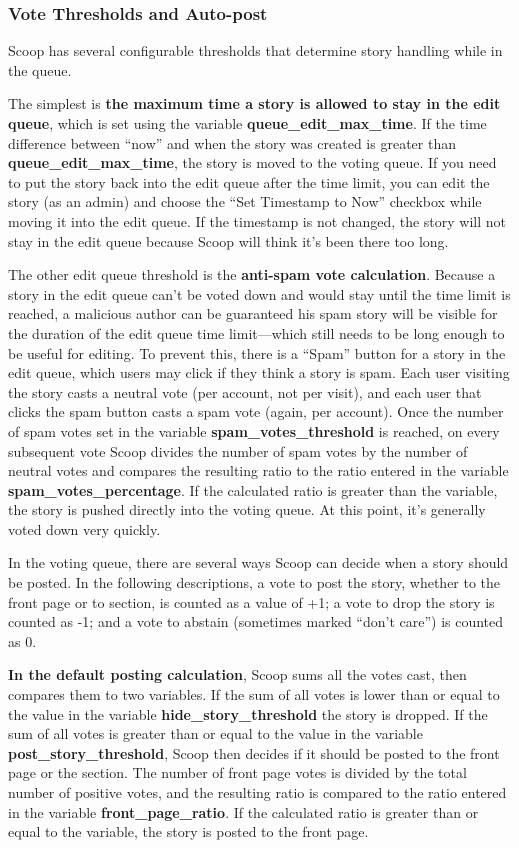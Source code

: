 \subsubsection{Vote Thresholds and Auto-post}
\label{moderation-autopost}

Scoop has several configurable thresholds that determine story handling while in the queue.

The simplest is {\bf the maximum time a story is allowed to stay in the edit queue}, which is set using the variable {\bf queue\_edit\_max\_time}.  If the time difference between ``now'' and when the story was created is greater than {\bf queue\_edit\_max\_time}, the story is moved to the voting queue.  If you need to put the story back into the edit queue after the time limit, you can edit the story (as an admin) and choose the ``Set Timestamp to Now'' checkbox while moving it into the edit queue.  If the timestamp is not changed, the story will not stay in the edit queue because Scoop will think it's been there too long.

The other edit queue threshold is the {\bf anti-spam vote calculation}.  Because a story in the edit queue can't be voted down and would stay until the time limit is reached, a malicious author can be guaranteed his spam story will be visible for the duration of the edit queue time limit---which still needs to be long enough to be useful for editing.  To prevent this, there is a ``Spam'' button for a story in the edit queue, which users may click if they think a story is spam.  Each user visiting the story casts a neutral vote (per account, not per visit), and each user that clicks the spam button casts a spam vote (again, per account).  Once the number of spam votes set in the variable {\bf spam\_votes\_threshold} is reached, on every subsequent vote Scoop divides the number of spam votes by the number of neutral votes and compares the resulting ratio to the ratio entered in the variable {\bf spam\_votes\_percentage}.  If the calculated ratio is greater than the variable, the story is pushed directly into the voting queue.  At this point, it's generally voted down very quickly.

In the voting queue, there are several ways Scoop can decide when a story should be posted.  In the following descriptions, a vote to post the story, whether to the front page or to section, is counted as a value of +1; a vote to drop the story is counted as -1; and a vote to abstain (sometimes marked ``don't care'') is counted as 0.

{\bf In the default posting calculation}, Scoop sums all the votes cast, then compares them to two variables.  If the sum of all votes is lower than or equal to the value in the variable {\bf hide\_story\_threshold} the story is dropped.  If the sum of all votes is greater than or equal to the value in the variable {\bf post\_story\_threshold}, Scoop then decides if it should be posted to the front page or the section.  The number of front page votes is divided by the total number of positive votes, and the resulting ratio is compared to the ratio entered in the variable {\bf front\_page\_ratio}.  If the calculated ratio is greater than or equal to the variable, the story is posted to the front page.

